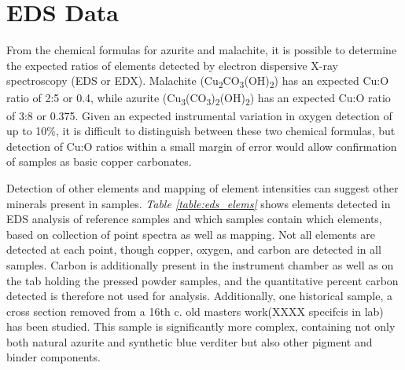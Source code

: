 
\section[EDS Data]{EDS Data}
\label{section3.2}

From the chemical formulas for azurite and malachite, it is possible to determine the expected ratios of elements detected by electron dispersive X-ray spectroscopy (EDS or EDX). Malachite (Cu\textsubscript{2}CO\textsubscript{3}(OH)\textsubscript{2}) has an expected Cu:O ratio of 2:5 or 0.4, while azurite (Cu\textsubscript{3}(CO\textsubscript{3})\textsubscript{2}(OH)\textsubscript{2}) has an expected Cu:O ratio of 3:8 or 0.375. Given an expected instrumental variation in oxygen detection of up to 10\%, it is difficult to distinguish between these two chemical formulas, but detection of Cu:O ratios within a small margin of error would allow confirmation of samples as basic copper carbonates.

Detection of other elements and mapping of element intensities can suggest other minerals present in samples. \textit{Table \ref{table:eds_elems}} shows elements detected in EDS analysis of reference samples and which samples contain which elements, based on collection of point spectra as well as mapping. Not all elements are detected at each point, though copper, oxygen, and carbon are detected in all samples. Carbon is additionally present in the instrument chamber as well as on the tab holding the pressed powder samples, and the quantitative percent carbon detected is therefore not used for analysis. Additionally, one historical sample, a cross section removed from a 16th c. old masters work(XXXX specifcis in lab) has been studied. This sample is significantly more complex, containing not only both natural azurite and synthetic blue verditer but also other pigment and binder components.

